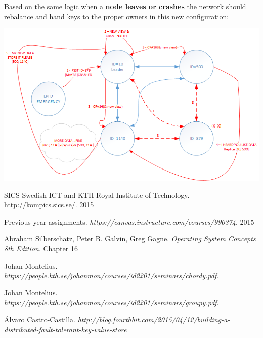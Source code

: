 \documentclass[a4paper, 11pt]{article}
\begin{document}
\clearpage

\noindent Based on the same logic when a \textbf{node leaves or crashes} the network should rebalance and hand keys to the proper owners in this new configuration:

\hspace*{-1in} {\centering\includegraphics[scale = 0.9]{./figures/nodecrash.png}\par}

\clearpage

\begin{thebibliography}{9}
	 SICS Swedish ICT and KTH Royal Institute of Technology.  http://kompics.sics.se/. 2015
	
	 Previous year assignments. \textit{https://canvas.instructure.com/courses/990374}. 2015
	
	  Abraham Silberschatz, Peter B. Galvin, Greg Gagne. \textit{Operating System Concepts 8th Edition}. Chapter 16 
	
	 Johan Montelius. \textit{https://people.kth.se/\~johanmon/courses/id2201/seminars/chordy.pdf}.
	
	 Johan Montelius. \textit{https://people.kth.se/\~johanmon/courses/id2201/seminars/groupy.pdf}.

	 Álvaro Castro-Castilla. \textit{	http://blog.fourthbit.com/2015/04/12/building-a-distributed-fault-tolerant-key-value-store}
\end{thebibliography}
\end{document}
